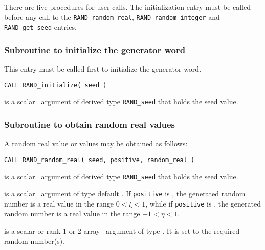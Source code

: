 \documentclass{galahad}
\newcommand{\packagename}{RAND}
\begin{document}

\galarguments
There are five procedures for user calls.
The initialization entry must be called before any call to the
{\tt \packagename\_random\_real},
{\tt \packagename\_random\_integer} and
{\tt \packagename\_get\_seed}  entries.


\subsubsection{Subroutine to initialize the generator word}\label{subinit}
This entry must be called first to initialize the generator word.
\vspace*{1mm}

\hskip 0.5in
{\tt CALL \packagename\_initialize( seed )}

\vspace*{-2mm}
\begin{description}
 is a scalar \intentout\ argument of derived type
{\tt \packagename\_seed}
that holds the seed value.
\end{description}


\subsubsection{Subroutine to obtain random real values}
A random real value or values may be obtained as follows:
\vspace*{1mm}

\hskip 0.5in
{\tt CALL \packagename\_random\_real( seed, positive, random\_real )}

\vspace*{-2mm}
\begin{description}
 is a scalar \intentinout\ argument of derived type
{\tt \packagename\_seed} that holds the seed value.

 is a scalar \intentin\ argument of type default
\logical. If {\tt positive} is \true,
the generated random number is a real value in the range $0 < \xi < 1$,
while if {\tt positive} is \false, the generated random number
is a real value in the range  $-1 < \eta < 1$.

 is a scalar or rank 1 or 2 array
\intentout\ argument of type \realdp.
It is set to the required random number(s).

\end{description}
\end{document}
